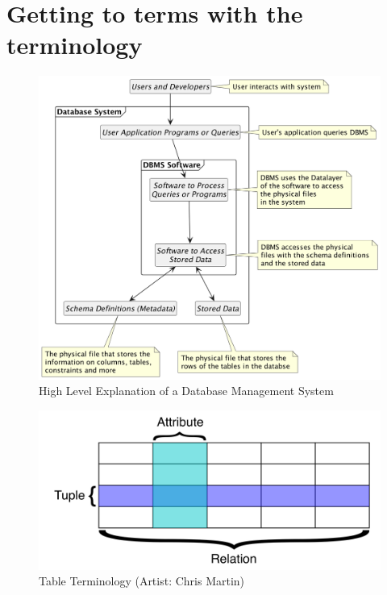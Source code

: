 \section{Getting to terms with the terminology}
\begin{figure}[h]
    \centering
    \includegraphics[width=1\textwidth]{content/1-relational-databases/figures/1.dbms-definitions.png}
    \caption{High Level Explanation of a Database Management System}
    \label{fig:1.dbms-definitions.png}
\end{figure}

\begin{figure}[h]
    \centering
    \includegraphics[width=1\textwidth]{content/1-relational-databases/figures/2.table-definitions.png}
    \caption{Table Terminology (Artist: Chris Martin)}
    \label{fig:2.table-definitions.png}
\end{figure}

